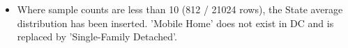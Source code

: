 \begin{itemize}
\item Where sample counts are less than 10 (812 / 21024 rows), the State average distribution has been inserted. 'Mobile Home' does not exist in DC and is replaced by 'Single-Family Detached'.
\end{itemize}
